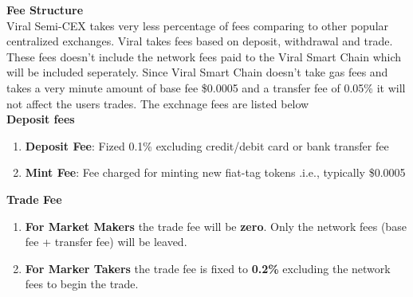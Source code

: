 \documentclass[10pt]{article}
\begin{document}

\textbf{Fee Structure}\\

Viral Semi-CEX takes very less percentage of fees comparing to other popular centralized exchanges. Viral takes fees based on deposit, withdrawal and trade. These fees doesn't include the network fees paid to the Viral Smart Chain which will be included seperately. Since Viral Smart Chain doesn't take gas fees and takes a very minute amount of base fee \$0.0005 and a transfer fee of 0.05\% it will not affect the users trades. The exchnage fees are listed below\\

\textbf{Deposit fees}
\begin{enumerate}[leftmargin=+0.2in]
\item \textbf{Deposit Fee}: Fized 0.1\% excluding credit/debit card or bank transfer fee
\item \textbf{Mint Fee}: Fee charged for minting new fiat-tag tokens .i.e., typically \$0.0005
\end{enumerate}

\textbf{Trade Fee}
\begin{enumerate}[leftmargin=+0.2in]
\item \textbf{For Market Makers} the trade fee will be \textbf{zero}. Only the network fees (base fee + transfer fee) will be leaved.
\item \textbf{For Marker Takers} the trade fee is fixed to \textbf{0.2\% }excluding the network fees to begin the trade.
\end{enumerate}
\end{document}
